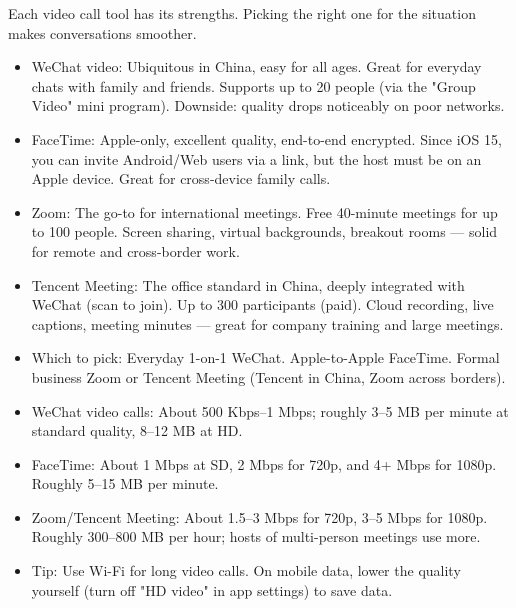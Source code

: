 
Each video call tool has its strengths. Picking the right one for the situation makes conversations smoother.

\begin{itemize}
  \item WeChat video: Ubiquitous in China, easy for all ages. Great for everyday chats with family and friends. Supports up to 20 people (via the "Group Video" mini program). Downside: quality drops noticeably on poor networks.
  \item FaceTime: Apple-only, excellent quality, end-to-end encrypted. Since iOS 15, you can invite Android/Web users via a link, but the host must be on an Apple device. Great for cross-device family calls.
  \item Zoom: The go-to for international meetings. Free 40-minute meetings for up to 100 people. Screen sharing, virtual backgrounds, breakout rooms — solid for remote and cross-border work.
  \item Tencent Meeting: The office standard in China, deeply integrated with WeChat (scan to join). Up to 300 participants (paid). Cloud recording, live captions, meeting minutes — great for company training and large meetings.
  \item Which to pick: Everyday 1-on-1 WeChat. Apple-to-Apple FaceTime. Formal business Zoom or Tencent Meeting (Tencent in China, Zoom across borders).
\end{itemize}


\begin{itemize}
  \item WeChat video calls: About 500 Kbps–1 Mbps; roughly 3–5 MB per minute at standard quality, 8–12 MB at HD.
  \item FaceTime: About 1 Mbps at SD, 2 Mbps for 720p, and 4+ Mbps for 1080p. Roughly 5–15 MB per minute.
  \item Zoom/Tencent Meeting: About 1.5–3 Mbps for 720p, 3–5 Mbps for 1080p. Roughly 300–800 MB per hour; hosts of multi-person meetings use more.
  \item Tip: Use Wi-Fi for long video calls. On mobile data, lower the quality yourself (turn off "HD video" in app settings) to save data.
\end{itemize}


